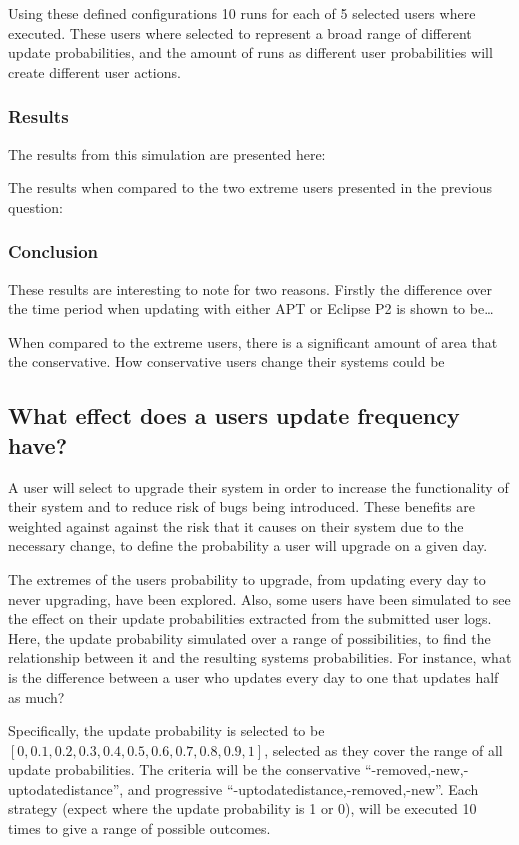 Using these defined configurations 10 runs for each of 5 selected users where executed. 
These users where selected to represent a broad range of different update probabilities, and the amount of runs as different user probabilities will create different user actions.

\subsubsection{Results}
The results from this simulation are presented here:

The results when compared to the two extreme users presented in the previous question:

\subsubsection{Conclusion}
These results are interesting to note for two reasons. 
Firstly the difference over the time period when updating with either APT or Eclipse P2 is shown to be\ldots

When compared to the extreme users, there is a significant amount of area that the conservative.
How conservative users change their systems could be 

\subsection{What effect does a users update frequency have?}
A user will select to upgrade their system in order to increase the functionality of their system and to reduce risk of bugs being introduced.
These benefits are weighted against against the risk that it causes on their system due to the necessary change, to define the probability a user will upgrade on a given day.

The extremes of the users probability to upgrade, from updating every day to never upgrading, have been explored.
Also, some users have been simulated to see the effect on their update probabilities extracted from the submitted user logs.
Here, the update probability simulated over a range of possibilities, to find the relationship between it and the resulting systems probabilities.
For instance, what is the difference between a user who updates every day to one that updates half as much?

Specifically, the update probability is selected to be $[0,0.1,0.2,0.3,0.4,0.5,0.6,0.7,0.8,0.9,1]$,
selected as they cover the range of all update probabilities.  
The criteria will be the conservative ``-removed,-new,-uptodatedistance'', and progressive ``-uptodatedistance,-removed,-new''.
Each strategy (expect where the update probability is 1 or 0), will be executed 10 times to give a range of possible outcomes.

